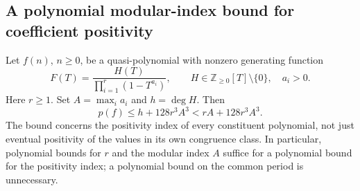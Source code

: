 \subsection{A polynomial modular-index bound for coefficient positivity}

\begin{proposition}
\label{prop:modularbound}
Let $f(n)$, $n\ge0$, be a quasi-polynomial with nonzero generating function
\[
 F(T)=\frac{H(T)}{\prod_{i=1}^r(1-T^{a_i})},\qquad
 H\in\mathbb Z_{\ge0}[T]\setminus\{0\},\quad a_i>0.
\]
Here $r\ge1$. Set $A=\max_i a_i$ and $h=\deg H$. Then
\[
 p(f)\le h+128r^3A^3 < rA+128r^3A^3.
 \tag{P-F11}
\]
The bound concerns the positivity index of every constituent polynomial,
not just eventual positivity of the values in its own congruence class.
In particular, polynomial bounds for $r$ and the modular index $A$
suffice for a polynomial bound for the positivity index; a polynomial
bound on the common period is unnecessary.
\end{proposition}
